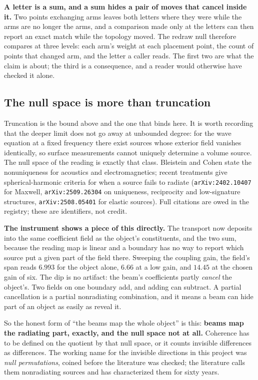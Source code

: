 \textbf{A letter is a sum, and a sum hides a pair of moves that cancel inside it.} Two points exchanging arms leaves both letters where they were while the arms are no longer the arms, and a comparison made only at the letters can then report an exact match while the topology moved. The redraw null therefore compares at three levels: each arm's weight at each placement point, the count of points that changed arm, and the letter a caller reads. The first two are what the claim is about; the third is a consequence, and a reader would otherwise have checked it alone.

\subsection{The null space is more than truncation}

Truncation is the bound above and the one that binds here. It is worth recording that the deeper limit does not go away at unbounded degree: for the wave equation at a fixed frequency there exist sources whose exterior field vanishes identically, so surface measurements cannot uniquely determine a volume source. The null space of the reading is exactly that class. Bleistein and Cohen state the nonuniqueness for acoustics and electromagnetics; recent treatments give spherical-harmonic criteria for when a source fails to radiate (\texttt{arXiv:2402.10407} for Maxwell, \texttt{arXiv:2509.26304} on uniqueness, reciprocity and low-signature structures, \texttt{arXiv:2508.05401} for elastic sources). Full citations are owed in the registry; these are identifiers, not credit.

\textbf{The instrument shows a piece of this directly.} The transport now deposits into the same coefficient field as the object's constituents, and the two sum, because the reading map is linear and a boundary has no way to report which source put a given part of the field there. Sweeping the coupling gain, the field's span reads \(6.993\) for the object alone, \(6.66\) at a low gain, and \(14.45\) at the chosen gain of six. The dip is no artifact: the beam's coefficients partly \emph{cancel} the object's. Two fields on one boundary add, and adding can subtract. A partial cancellation is a partial nonradiating combination, and it means a beam can hide part of an object as easily as reveal it.

So the honest form of ``the beams map the whole object'' is this: \textbf{beams map the radiating part, exactly, and the null space not at all.} Coherence has to be defined on the quotient by that null space, or it counts invisible differences as differences. The working name for the invisible directions in this project was \emph{null permutations}, coined before the literature was checked; the literature calls them nonradiating sources and has characterized them for sixty years.

